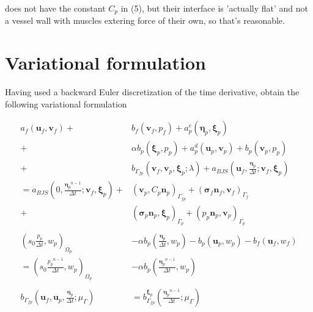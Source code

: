 \documentclass{article}
\newcommand{\mathspace}[1]{\ensuremath{#1}\xspace} %
\newcommand{\sigmabf}{\mathspace{\boldsymbol{\sigma}}}
\newcommand{\inner}[2]{\mathspace{\left (#1, #2 \right)}}
\newcommand{\dt}{\mathspace{\Delta t}}
\newcommand{\stokesbdy}{\mathspace{\Gamma_{f}}}
\newcommand{\darcy}{\mathspace{\Omega_{p}}}
\newcommand{\darcybdy}{\mathspace{\Gamma_{p}}}
\newcommand{\interface}{\mathspace{\Gamma_{fp}}}
\newcommand{\nf}{\mathspace{\mathbf{n}_f}}
\newcommand{\np}{\mathspace{\mathbf{n}_p}}
\newcommand{\uf}{\mathspace{\mathbf{u}_f}}
\newcommand{\vf}{\mathspace{\mathbf{v}_f}}
\newcommand{\up}{\mathspace{\mathbf{u}_p}}
\newcommand{\vp}{\mathspace{\mathbf{v}_p}}
\newcommand{\pf}{\mathspace{p_f}}
\newcommand{\pp}{\mathspace{p_p}}
\newcommand{\wf}{\mathspace{w_f}}
\renewcommand{\wp}{\mathspace{w_p}}
\newcommand{\disp}{\mathspace{\boldsymbol{\eta}_p}}
\newcommand{\disptest}{\mathspace{\boldsymbol{\xi}_p}}
\newcommand{\mult}{\mathspace{\lambda_{\Gamma}}}
\newcommand{\multtest}{\mathspace{\mu_{\Gamma}}}
\begin{document}
\cite{ambartsumyan} does not have the constant $C_p$ in (5), but their interface is 'actually flat' and not a vessel wall with muscles extering force of their own, so that's reasonable.


\section{Variational formulation}
Having used a backward Euler discretization of the time derivative, \cite{ambartsumyan} obtain the following variational formulation

\begin{subequations}
  \begin{align}
    a_f(\uf, \vf) +& b_f(\vf, \pf)  + a^e_p(\disp, \disptest) \label{eq:varform1} \\
    +&\alpha b_p(\disptest, \pp)  + a_p^d(\up, \vp) + b_p(\vp, \pp)  \nonumber \\
    + &b_{\interface}\left (\vf, \vp, \disptest; \lambda \right ) + a_{BJS}\left (\uf, \frac{\disp} {\dt}; \vf, \disptest \right)\nonumber \\
                   = a_{BJS}\left (0, \frac{\disp^{n-1}} {\dt}; \vf, \disptest \right) + & \inner{\vp}{C_p\np}_{\interface} + (\sigmabf_f\nf, \vf)_{\stokesbdy} \nonumber \\
                   + & (\sigmabf_p\np, \disptest)_{\darcybdy} + (\pp\np, \vp)_{\darcybdy}\nonumber \\ \nonumber \\
    \inner{s_0 \frac {\pp} {\dt}}{\wp}_{\darcy}  &- \alpha b_p\left ( \frac{\disp} {\dt}, \wp \right ) - b_p(\up, \wp) - b_f(\uf, \wf) \label{eq:varform2}
    \\ = \inner{s_0 \frac {\pp^{n-1}} {\dt}}{\wp}_{\darcy} &- \alpha b_p\left ( \frac {\disp^{n-1}} {\dt}, \wp \right ) \nonumber \\ \nonumber \\
    b_{\interface}\left (\uf, \up, \frac {\disp} {\dt}; \multtest \right ) &= b^{\disptest}_{\interface}\left (\frac {\disp^{n-1}} {\dt}; \multtest \right ) \label{eq:varform3}
  \end{align}
\end{subequations}
\end{document}
